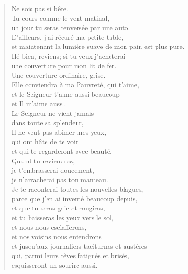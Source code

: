 \documentclass[11pt]{book}
\newcommand*{\centeredornament}{\centerline{\pgfornament[width=6cm]{88}}}
\begin{document}
\begin{verse}
  Ne sois pas si bête. \\
  Tu cours comme le vent matinal, \\
  un jour tu seras renversée par une auto. \\
  D'ailleurs, j'ai récuré ma petite table, \\
  et maintenant la lumière suave de mon pain est plus pure. \\
  Hé bien, reviens; si tu veux j'achèterai \\
  une couverture pour mon lit de fer. \\
  Une couverture ordinaire, grise. \\
  Elle conviendra à ma Pauvreté, qui t'aime, \\
  et le Seigneur t'aime aussi beaucoup \\
  et Il m'aime aussi. \\
  Le Seigneur ne vient jamais \\
  dans toute sa splendeur, \\
  Il ne veut pas abîmer mes yeux, \\
  qui ont hâte de te voir \\
  et qui te regarderont avec beauté. \\
  Quand tu reviendras, \\
  je t'embrasserai doucement, \\
  je n'arracherai pas ton manteau. \\
  Je te raconterai toutes les nouvelles blagues, \\
  parce que j'en ai inventé beaucoup depuis, \\
  et que tu seras gaie et rougiras, \\
  et tu baisseras les yeux vers le sol, \\
  et nous nous esclafferons, \\
  et nos voisins nous entendrons \\
  et jusqu'aux journaliers taciturnes et austères \\
  qui, parmi leurs rêves fatigués et brisés, \\
  esquisseront un sourire aussi.
\end{verse}

\newpage

\vspace*{-15mm}
\centeredornament


\end{document}
